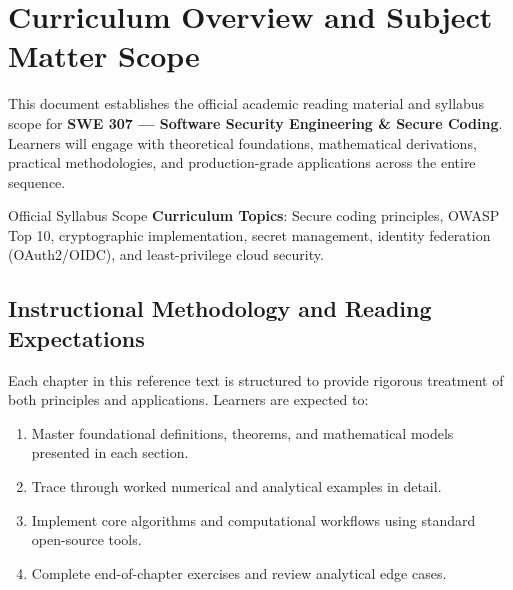 \section{Curriculum Overview and Subject Matter Scope}

This document establishes the official academic reading material and syllabus scope for \textbf{SWE 307 --- Software Security Engineering \& Secure Coding}. Learners will engage with theoretical foundations, mathematical derivations, practical methodologies, and production-grade applications across the entire sequence.

\begin{InsightBox}{Official Syllabus Scope}
  \textbf{Curriculum Topics}: Secure coding principles, OWASP Top 10, cryptographic implementation, secret management, identity federation (OAuth2/OIDC), and least-privilege cloud security.
\end{InsightBox}

\subsection{Instructional Methodology and Reading Expectations}

Each chapter in this reference text is structured to provide rigorous treatment of both principles and applications. Learners are expected to:
\begin{enumerate}
  \item Master foundational definitions, theorems, and mathematical models presented in each section.
  \item Trace through worked numerical and analytical examples in detail.
  \item Implement core algorithms and computational workflows using standard open-source tools.
  \item Complete end-of-chapter exercises and review analytical edge cases.
\end{enumerate}

